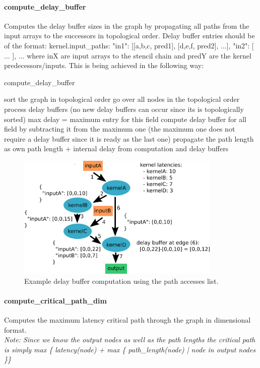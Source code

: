 \paragraph{compute\_delay\_buffer}
Computes the delay buffer sizes in the graph by propagating all paths from the input arrays to the successors in topological order. Delay buffer entries should be of the format: kernel.input\_paths:{
	"in1": [[a,b,c, pred1], [d,e,f, pred2], ...],
	"in2": [ ... ],
	...
}
where inX are input arrays to the stencil chain and predY are the kernel predecessors/inputs. This is being achieved in the following way:
\begin{algorithm}
	\caption{compute\_delay\_buffer}
	\begin{algorithmic}
		\STATE sort the graph in topological order
		\STATE go over all nodes in the topological order
		\STATE process delay buffers (no new delay buffers can occur since its is topologically sorted)
		\STATE max delay = maximum entry for this field
		\STATE compute delay buffer for all field by subtracting it from the maximum one (the maximum one does not require a delay buffer since it is ready as the last one)
		\STATE propagate the path length as own path length + internal delay from computation and delay buffers
	\end{algorithmic}
\end{algorithm}

\begin{figure}[h]
	\centering
	\includegraphics[height=16em]{drawings/software-delay-buffer.png}
	\caption{Example delay buffer computation using the path accesses list.}
	\label{fig:software-delay-buffer}
\end{figure}


\paragraph{compute\_critical\_path\_dim}
Computes the maximum latency critical path through the graph in dimensional format. \\
\textit{Note: Since we know the output nodes as well as the path lengths the critical path is simply
	max \{ latency(node) + max \{ path\_length(node) | node in output nodes \}\} }


